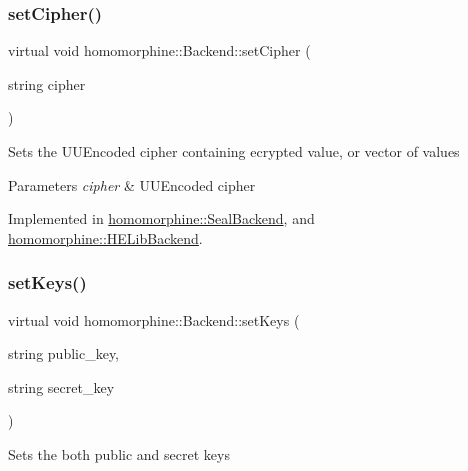 \mbox{\label{classhomomorphine_1_1_backend_a29f49f5c862cf090ac98ade663e67c64}} 
\subsubsection{\texorpdfstring{setCipher()}{setCipher()}}
{\footnotesize\ttfamily virtual void homomorphine\+::\+Backend\+::set\+Cipher (\begin{DoxyParamCaption}\item[{string}]{cipher }\end{DoxyParamCaption})\hspace{0.3cm}{\ttfamily [pure virtual]}}

Sets the U\+U\+Encoded cipher containing ecrypted value, or vector of values


\begin{DoxyParams}{Parameters}
{\em cipher} & U\+U\+Encoded cipher \\
\hline
\end{DoxyParams}


Implemented in \mbox{\hyperlink{classhomomorphine_1_1_seal_backend_a866b58e41809d68d4c6ed8c3afb27712}{homomorphine\+::\+Seal\+Backend}}, and \mbox{\hyperlink{classhomomorphine_1_1_h_e_lib_backend_a5baa6ad05fbb23d27c4ec4bb018a8c64}{homomorphine\+::\+H\+E\+Lib\+Backend}}.

\mbox{\label{classhomomorphine_1_1_backend_a48558b9cf1c143d92d83fa095dd84413}} 
\subsubsection{\texorpdfstring{setKeys()}{setKeys()}}
{\footnotesize\ttfamily virtual void homomorphine\+::\+Backend\+::set\+Keys (\begin{DoxyParamCaption}\item[{string}]{public\+\_\+key,  }\item[{string}]{secret\+\_\+key }\end{DoxyParamCaption})\hspace{0.3cm}{\ttfamily [pure virtual]}}

Sets the both public and secret keys


